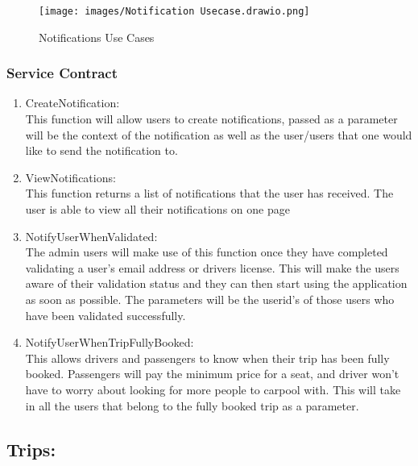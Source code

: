 \documentclass[hidelinks, 12pt, a4paper]{article}
\begin{document}
\begin{figure}[H]

      \centering
      \texttt{[image: images/Notification Usecase.drawio.png]}
      \caption{Notifications Use Cases}
      \label{fig:User UseCases}

\end{figure}
\newpage
\subsubsection{Service Contract}

\begin{enumerate}[label=U1.\arabic*]

      \item CreateNotification:\\
            This function will allow users to create notifications, passed as a parameter will be the context of the notification as well as the user/users that one would like to send the notification to.\\

      \item ViewNotifications:\\
            This function returns a list of notifications that the user has received. The user is able to view all their notifications on one page\\

      \item NotifyUserWhenValidated:\\
            The admin users will make use of this function once they have completed validating a user’s email address or drivers license. This will make the users aware of their validation status and they can then start using the application as soon as possible. The parameters will be the userid’s of those users who have been validated successfully.\\

      \item NotifyUserWhenTripFullyBooked: \\
            This allows drivers and passengers to know when their trip has been fully booked. Passengers will pay the minimum price for a seat, and driver won’t have to worry about looking for more people to carpool with. This will take in all the users that belong to the fully booked trip as a parameter.\\

\end{enumerate}
\newpage
\subsection{Trips:}
\end{document}
